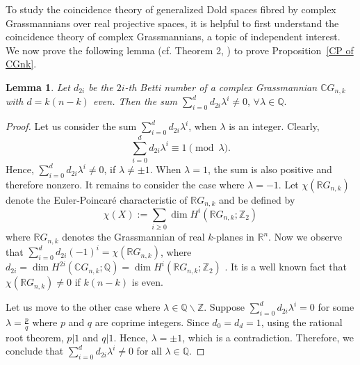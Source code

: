 \documentclass{amsart}
\newtheorem{lemma}[theorem]{Lemma}
\newcommand{\propref}[1]{Proposition~\ref{#1}}
\begin{document}
	To study the coincidence theory of generalized Dold spaces fibred by complex Grassmannians over real projective spaces, it is helpful to first understand the coincidence theory of complex Grassmannians, a topic of independent interest. We now %
prove the following lemma (cf. Theorem 2, \cite{glover-homer}) to %
prove \propref{CP of CGnk}.
	\begin{lemma}\label{sum neq 0}
		Let $d_{2i}$ be the $2i$-th Betti number of a complex Grassmannian $\mathbb CG_{n,k}$ with $d=k(n-k)$ even. Then the sum \(\sum _{i=0}^d d_{2i}\lambda^i\neq 0,\, \forall \lambda \in \mathbb Q.\)
	\end{lemma}
	\begin{proof}
		Let us consider the sum $\sum_{i=0}^d d_{2i}\lambda^i$, when $\lambda$ is an integer. 
		Clearly, $$\sum_{i=0}^d d_{2i}\lambda^i \equiv 1 \pmod{\lambda}.$$ %
		Hence, $\sum_{i=0}^d d_{2i}\lambda^i \neq 0$, if $\lambda \neq \pm 1$. When $\lambda = 1$, the sum is also positive and therefore nonzero. It remains to consider the case where $\lambda = -1$.
		Let $\chi(\mathbb{R}G_{n,k})$ denote the Euler-Poincaré characteristic of $\mathbb{R}G_{n,k}$ and be defined by $$\chi(X):=\sum_{i\ge0}\dim H^i(\mathbb{R}G_{n,k};\mathbb{Z}_2)$$ where $\mathbb{R}G_{n,k}$ denotes the Grassmannian of real $k$-planes in $\mathbb{R}^n$.
		Now we observe %
that 
		$\sum_{i=0}^d d_{2i}(-1)^i = \chi(\mathbb{R}G_{n,k})$, where $d_{2i} = \operatorname{dim} H^{2i}(\mathbb{C}G_{n,k}; \mathbb{Q}) = \dim H^{i}(\mathbb{R}G_{n,k}; \mathbb{Z}_2)$%
. 
		It is a well known fact that $\chi(\mathbb{R}G_{n,k}) \neq 0$ if $k(n-k)$ is even. 
		
		Let us move to the other case where $\lambda\in \mathbb{Q}\backslash \mathbb{Z}$. Suppose $\sum_{i=0}^{d} d_{2i}\lambda^i =0$ for some $\lambda = \frac{p}{q}$ where $p$ and $q$ are coprime integers. Since $d_0 =d_d =1$, using the rational %
root theorem, $p|1$ %
and $q|1$. Hence, $\lambda = \pm 1$, which is a contradiction. Therefore, we conclude that $\sum_{i=0}^{d} d_{2i}\lambda^i \neq 0$ for all $\lambda\in \mathbb Q$. 
	\end{proof}
	
\end{document}
